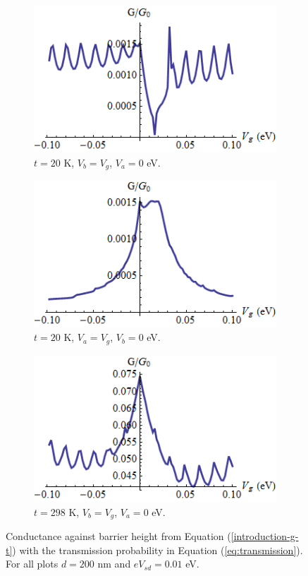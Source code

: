		\begin{figure}[h]
			 \begin{subfigure}[h]{0.3\textwidth}
				\centerline{\includegraphics[scale=0.35]{images/pot-vg-1}}
				\caption{$t=20$ K, $V_{b}=V_{g}$, $V_{a}=0$ eV.}
			\end{subfigure}
			\hspace{0.5cm}
			\begin{subfigure}[h]{0.3\textwidth}
				\centerline{\includegraphics[scale=0.35]{images/pot-vg-2}}
				\caption{$t=20$ K, $V_{a}=V_{g}$, $V_{b}=0$ eV.}
			\end{subfigure}
			\hspace{0.5cm}
			\begin{subfigure}[h]{0.3\textwidth}
				\centerline{\includegraphics[scale=0.35]{images/pot-vg-3}}
				\caption{$t=298$ K, $V_{b}=V_{g}$, $V_{a}=0$ eV.}
			\end{subfigure}
			\caption{Conductance against barrier height from Equation (\ref{introduction-g-t}) with the transmission probability in Equation (\ref{eq:transmission}). For all plots $d=200$ nm and $eV_{sd}=0.01$ eV.}
			\label{pot-vg-1}
		\end{figure}

